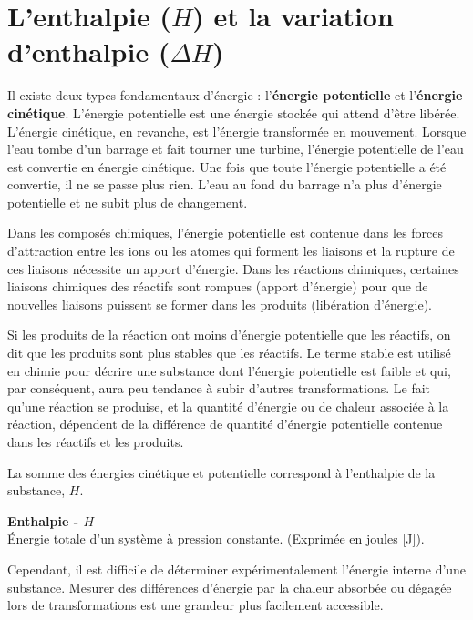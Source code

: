 \documentclass[
  11pt,
  a4paper,
  openany]{book}
\begin{document}
\section{\texorpdfstring{L'enthalpie (\(H\)) et la variation d'enthalpie (\(\Delta H\))}{L'enthalpie (H) et la variation d'enthalpie (\textbackslash Delta H)}}\label{lenthalpie-h-et-la-variation-denthalpie-delta-h}

Il existe deux types fondamentaux d'énergie : l'\textbf{énergie potentielle} et l'\textbf{énergie cinétique}. L'énergie potentielle est une énergie stockée qui attend d'être libérée. L'énergie cinétique, en revanche, est l'énergie transformée en mouvement. Lorsque l'eau tombe d'un barrage et fait tourner une turbine, l'énergie potentielle de l'eau est convertie en énergie cinétique. Une fois que toute l'énergie potentielle a été convertie, il ne se passe plus rien. L'eau au fond du barrage n'a plus d'énergie potentielle et ne subit plus de changement.

Dans les composés chimiques, l'énergie potentielle est contenue dans les forces d'attraction entre les ions ou les atomes qui forment les liaisons et la rupture de ces liaisons nécessite un apport d'énergie. Dans les réactions chimiques, certaines liaisons chimiques des réactifs sont rompues (apport d'énergie) pour que de nouvelles liaisons puissent se former dans les produits (libération d'énergie).

Si les produits de la réaction ont moins d'énergie potentielle que les réactifs, on dit que les produits sont plus stables que les réactifs. Le terme stable est utilisé en chimie pour décrire une substance dont l'énergie potentielle est faible et qui, par conséquent, aura peu tendance à subir d'autres transformations. Le fait qu'une réaction se produise, et la quantité d'énergie ou de chaleur associée à la réaction, dépendent de la différence de quantité d'énergie potentielle contenue dans les réactifs et les produits.

La somme des énergies cinétique et potentielle correspond à l'enthalpie de la substance, \(H\).

\begin{tcolorbox}
\textbf{Enthalpie - \(H\)}\\
Énergie totale d'un système à pression constante. (Exprimée en joules {[}J{]}).

\end{tcolorbox}

Cependant, il est difficile de déterminer expérimentalement l'énergie interne d'une substance. Mesurer des différences d'énergie par la chaleur absorbée ou dégagée lors de transformations est une grandeur plus facilement accessible.
\end{document}
